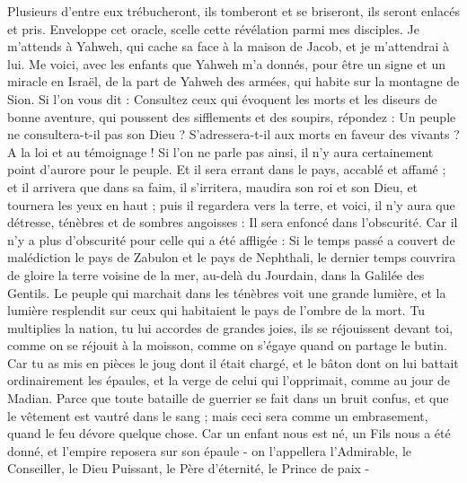 \begin{multicols}{2}
Plusieurs d'entre eux trébucheront, ils tomberont et se briseront, ils seront enlacés et pris.
Enveloppe cet oracle, scelle cette révélation parmi mes disciples.
Je m'attends à Yahweh, qui cache sa face à la maison de Jacob, et je m'attendrai à lui.
Me voici, avec les enfants que Yahweh m'a donnés, pour être un signe et un miracle en Israël, de la part de Yahweh des armées, qui habite sur la montagne de Sion.
Si l'on vous dit : Consultez ceux qui évoquent les morts et les diseurs de bonne aventure, qui poussent des sifflements et des soupirs, répondez : Un peuple ne consultera-t-il pas son Dieu ? S'adressera-t-il aux morts en faveur des vivants ?
A la loi et au témoignage ! Si l'on ne parle pas ainsi, il n'y aura certainement point d'aurore pour le peuple.
Et il sera errant dans le pays, accablé et affamé ; et il arrivera que dans sa faim, il s'irritera, maudira son roi et son Dieu, et tournera les yeux en haut ;
puis il regardera vers la terre, et voici, il n'y aura que détresse, ténèbres et de sombres angoisses : Il sera enfoncé dans l'obscurité.
Car il n'y a plus d'obscurité pour celle qui a été affligée : Si le temps passé a couvert de malédiction le pays de Zabulon et le pays de Nephthali, le dernier temps couvrira de gloire la terre voisine de la mer, au-delà du Jourdain, dans la Galilée des Gentils.
\VerseOne{}Le peuple qui marchait dans les ténèbres voit une grande lumière, et la lumière resplendit sur ceux qui habitaient le pays de l'ombre de la mort.
Tu multiplies la nation, tu lui accordes de grandes joies, ils se réjouissent devant toi, comme on se réjouit à la moisson, comme on s'égaye quand on partage le butin.
Car tu as mis en pièces le joug dont il était chargé, et le bâton dont on lui battait ordinairement les épaules, et la verge de celui qui l'opprimait, comme au jour de Madian.
Parce que toute bataille de guerrier se fait dans un bruit confus, et que le vêtement est vautré dans le sang ; mais ceci sera comme un embrasement, quand le feu dévore quelque chose.
Car un enfant nous est né, un Fils nous a été donné, et l'empire reposera sur son épaule - on l'appellera l'Admirable, le Conseiller, le Dieu Puissant, le Père d'éternité, le Prince de paix -

\end{multicols}
